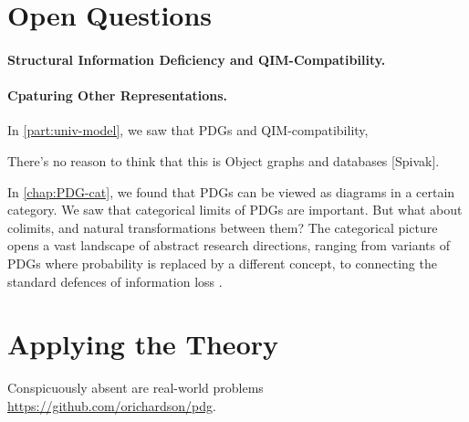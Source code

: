 \section{Open Questions}

\paragraph{Structural Information Deficiency and QIM-Compatibility.}

\paragraph{Cpaturing Other Representations.}
In \cref{part:univ-model}, we saw that PDGs and QIM-compatibility,


There's no reason to think that this is 
Object graphs and databases [Spivak].

In \cref{chap:PDG-cat}, we found that PDGs can be viewed as diagrams in a certain category. We saw that categorical limits of PDGs are important. But what about colimits, and natural transformations between them? 
The categorical picture opens a vast landscape of abstract research directions, ranging from variants of PDGs where probability is replaced by a different concept, to connecting the standard defences of information loss \citep[Theorem ??]{leinster2021entropy}.


\section{Applying the Theory}


Conspicuously absent are real-world problems 
\url{https://github.com/orichardson/pdg}.
